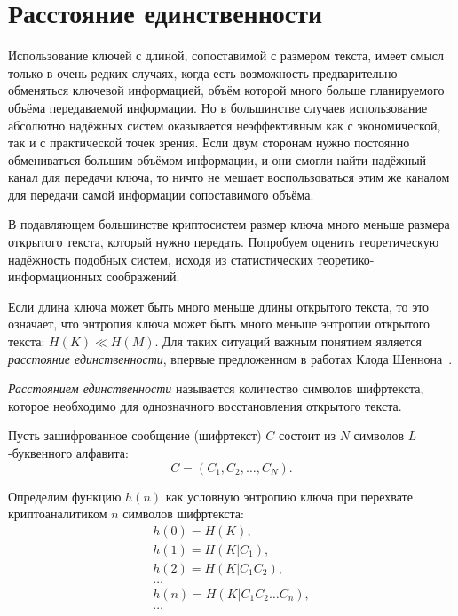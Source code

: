 \section{Расстояние единственности}\label{section_unicity_distance}

Использование ключей с длиной, сопоставимой с размером текста, имеет смысл только в очень редких случаях, когда есть возможность предварительно обменяться ключевой информацией, объём которой много больше планируемого объёма передаваемой информации. Но в большинстве случаев использование абсолютно надёжных систем оказывается неэффективным как с экономической, так и с практической точек зрения. Если двум сторонам нужно постоянно обмениваться большим объёмом информации, и они смогли найти надёжный канал для передачи ключа, то ничто не мешает воспользоваться этим же каналом для передачи самой информации сопоставимого объёма.

В подавляющем большинстве криптосистем размер ключа много меньше размера открытого текста, который нужно передать. Попробуем оценить теоретическую надёжность подобных систем, исходя из статистических теоретико-информационных соображений.

Если длина ключа может быть много меньше длины открытого текста, то это означает, что энтропия ключа может быть много меньше энтропии открытого текста: $H(K) \ll H(M)$. Для таких ситуаций важным понятием является \emph{расстояние единственности}, впервые предложенном в работах Клода Шеннона~\cite{Golomb:2002, Schneier:2011}.

\begin{definition}\label{definition:unicity_distance}
\emph{Расстоянием единственности} называется количество символов шифртекста, которое необходимо для однозначного восстановления открытого текста.
\end{definition}

Пусть зашифрованное сообщение (шифртекст) $C$ состоит из $N$ символов $L$-буквенного алфавита:
	\[C = (C_1, C_2, \dots, C_N).\]

Определим функцию $h(n)$ как условную энтропию ключа при перехвате криптоаналитиком $n$ символов шифртекста:
\[ \begin{array}{l}
    h ( 0 ) = H(K), \\
    h ( 1 ) = H(K | C_1), \\
    h ( 2 ) = H(K | C_1 C_2), \\
    \dots \\
    h ( n ) = H(K | C_1 C_2 \dots C_n), \\
    \dots
\end{array} \]

